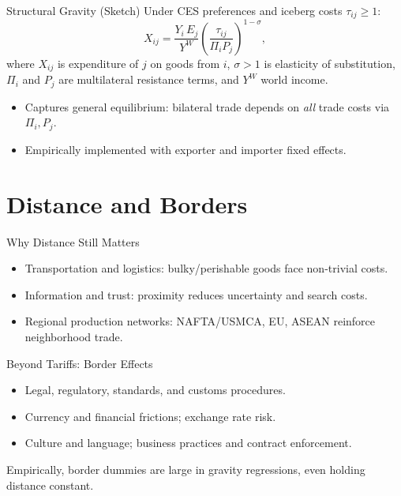 \documentclass{beamer}
\begin{document}
\begin{frame}{Structural Gravity (Sketch)}
Under CES preferences and iceberg costs $\tau_{ij} \ge 1$:
\begin{equation*}
X_{ij} = \frac{Y_i\,E_j}{Y^W} \left(\frac{\tau_{ij}}{\Pi_i P_j}\right)^{1-\sigma},
\end{equation*}
where $X_{ij}$ is expenditure of $j$ on goods from $i$, $\sigma>1$ is elasticity of substitution, $\Pi_i$ and $P_j$ are multilateral resistance terms, and $Y^W$ world income.
\begin{itemize}
  \item Captures general equilibrium: bilateral trade depends on \emph{all} trade costs via $\Pi_i, P_j$.
  \item Empirically implemented with exporter and importer fixed effects.
\end{itemize}
\end{frame}

\section{Distance and Borders}
\begin{frame}{Why Distance Still Matters}
\begin{itemize}
  \item Transportation and logistics: bulky/perishable goods face non-trivial costs.
  \item Information and trust: proximity reduces uncertainty and search costs.
  \item Regional production networks: NAFTA/USMCA, EU, ASEAN reinforce neighborhood trade.
\end{itemize}
\end{frame}

\begin{frame}{Beyond Tariffs: Border Effects}
\begin{itemize}
  \item Legal, regulatory, standards, and customs procedures.
  \item Currency and financial frictions; exchange rate risk.
  \item Culture and language; business practices and contract enforcement.
\end{itemize}
\vspace{0.5em}
Empirically, border dummies are large in gravity regressions, even holding distance constant.
\end{frame}
\end{document}
